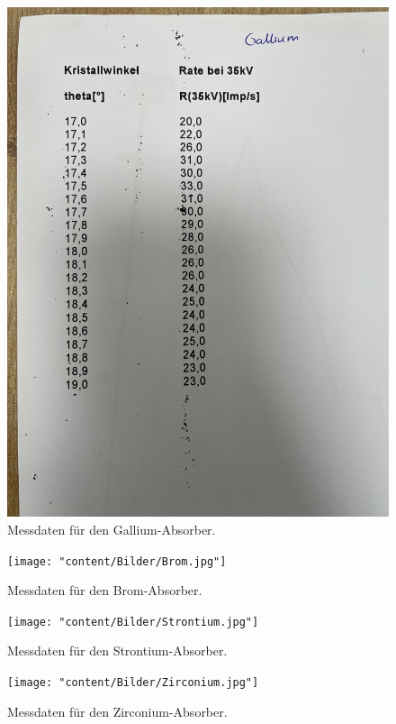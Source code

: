   \begin{figure}[H]
    \centering
    \includegraphics[width=\textwidth, angle=270, origin=c]{"content/Bilder/Gallium.jpg"}
    \caption{Messdaten für den Gallium-Absorber.}
    \label{fig:Messungen_5}
  \end{figure}
  \begin{figure}[H]
    \centering
    \texttt{[image: "content/Bilder/Brom.jpg"]}
    \caption{Messdaten für den Brom-Absorber.}
    \label{fig:Messungen_6}
  \end{figure}
  \begin{figure}[H]
    \centering
    \texttt{[image: "content/Bilder/Strontium.jpg"]}
    \caption{Messdaten für den Strontium-Absorber.}
    \label{fig:Messungen_7}
  \end{figure}
  \begin{figure}[H]
    \centering
    \texttt{[image: "content/Bilder/Zirconium.jpg"]}
    \caption{Messdaten für den Zirconium-Absorber.}
    \label{fig:Messungen_8}
  \end{figure}
